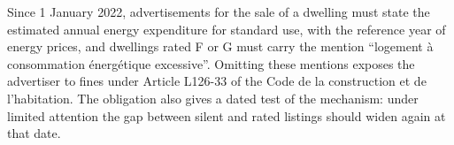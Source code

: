 Since 1 January 2022, advertisements for the sale of a dwelling must state the estimated annual energy expenditure for standard use, with the reference year of energy prices, and dwellings rated F or G must carry the mention ``logement \`a consommation \'energ\'etique excessive''. Omitting these mentions exposes the advertiser to fines under Article L126-33 of the Code de la construction et de l'habitation. %
The obligation also gives a dated test of the mechanism: under limited attention the gap between silent and rated listings should widen again at that date.